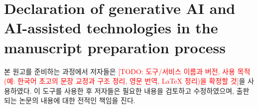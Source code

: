 \documentclass[preprint,12pt]{elsarticle}
\newcommand{\TODO}[1]{\textcolor{red}{[TODO: #1]}}
\begin{document}
\section*{Declaration of generative AI and AI-assisted technologies in the
manuscript preparation process}
본 원고를 준비하는 과정에서 저자들은 \TODO{도구/서비스 이름과 버전, 사용
목적(예: 한국어 초고의 문장 교정과 구조 정리, 영문 번역, LaTeX 정리)을
확정할 것}을 사용하였다. 이 도구를 사용한 후 저자들은 필요한 내용을
검토하고 수정하였으며, 출판되는 논문의 내용에 대한 전적인 책임을 진다.



\end{document}
